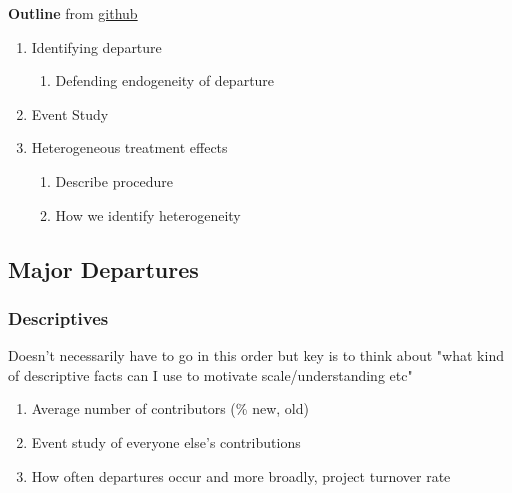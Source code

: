 \documentclass[source/paper/main.tex]{subfiles}
\begin{document}
\textbf{Outline} from \href{https://github.com/liaochris/oss_hierarchy/issues/2#issuecomment-2589020215}{github}
\begin{enumerate}
    \item Identifying departure
        \begin{enumerate}
            \item Defending endogeneity of departure
        \end{enumerate}
    \item Event Study
    \item Heterogeneous treatment effects
    \begin{enumerate}
        \item Describe procedure
        \item How we identify heterogeneity
    \end{enumerate}
\end{enumerate}

\subsection{Major Departures}
\subsubsection{Descriptives}
Doesn't necessarily have to go in this order but key is to think about "what kind of descriptive facts can I use to motivate scale/understanding etc"
\begin{enumerate}
    \item Average number of contributors (\% new, old)
    \item Event study of everyone else’s contributions
    \item How often departures occur and more broadly, project turnover rate

\end{enumerate}
\end{document}
